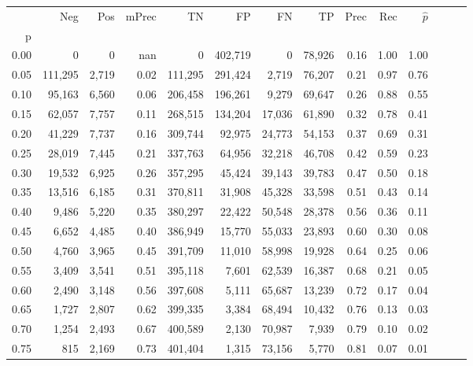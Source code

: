 \begin{tabular}{rrrrrrrrrrrrrr}
\toprule
{} &      Neg &    Pos & mPrec &       TN &       FP &      FN &      TP &  Prec &   Rec & $\hat{p}$ \\
p    &          &        &       &          &          &         &         &       &       &           \\
\midrule
0.00 &        0 &      0 &   nan &        0 &  402,719 &       0 &  78,926 &  0.16 &  1.00 &      1.00 \\
0.05 &  111,295 &  2,719 &  0.02 &  111,295 &  291,424 &   2,719 &  76,207 &  0.21 &  0.97 &      0.76 \\
0.10 &   95,163 &  6,560 &  0.06 &  206,458 &  196,261 &   9,279 &  69,647 &  0.26 &  0.88 &      0.55 \\
0.15 &   62,057 &  7,757 &  0.11 &  268,515 &  134,204 &  17,036 &  61,890 &  0.32 &  0.78 &      0.41 \\
0.20 &   41,229 &  7,737 &  0.16 &  309,744 &   92,975 &  24,773 &  54,153 &  0.37 &  0.69 &      0.31 \\
0.25 &   28,019 &  7,445 &  0.21 &  337,763 &   64,956 &  32,218 &  46,708 &  0.42 &  0.59 &      0.23 \\
0.30 &   19,532 &  6,925 &  0.26 &  357,295 &   45,424 &  39,143 &  39,783 &  0.47 &  0.50 &      0.18 \\
0.35 &   13,516 &  6,185 &  0.31 &  370,811 &   31,908 &  45,328 &  33,598 &  0.51 &  0.43 &      0.14 \\
0.40 &    9,486 &  5,220 &  0.35 &  380,297 &   22,422 &  50,548 &  28,378 &  0.56 &  0.36 &      0.11 \\
0.45 &    6,652 &  4,485 &  0.40 &  386,949 &   15,770 &  55,033 &  23,893 &  0.60 &  0.30 &      0.08 \\
0.50 &    4,760 &  3,965 &  0.45 &  391,709 &   11,010 &  58,998 &  19,928 &  0.64 &  0.25 &      0.06 \\
0.55 &    3,409 &  3,541 &  0.51 &  395,118 &    7,601 &  62,539 &  16,387 &  0.68 &  0.21 &      0.05 \\
0.60 &    2,490 &  3,148 &  0.56 &  397,608 &    5,111 &  65,687 &  13,239 &  0.72 &  0.17 &      0.04 \\
0.65 &    1,727 &  2,807 &  0.62 &  399,335 &    3,384 &  68,494 &  10,432 &  0.76 &  0.13 &      0.03 \\
0.70 &    1,254 &  2,493 &  0.67 &  400,589 &    2,130 &  70,987 &   7,939 &  0.79 &  0.10 &      0.02 \\
0.75 &      815 &  2,169 &  0.73 &  401,404 &    1,315 &  73,156 &   5,770 &  0.81 &  0.07 &      0.01 \\

\end{tabular}
